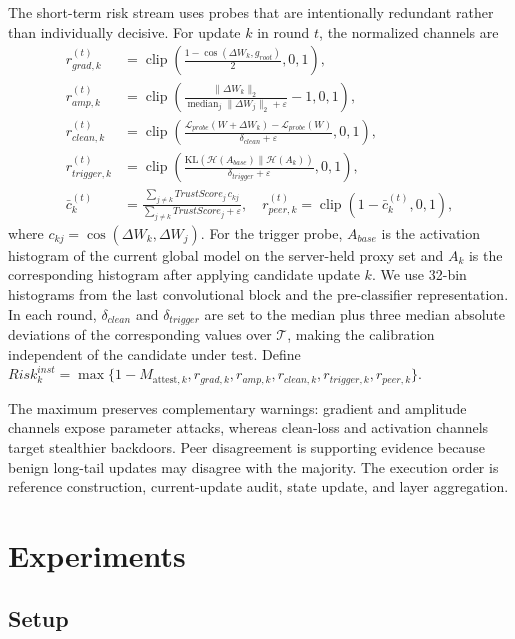 \documentclass[runningheads,orivec]{llncs}
\begin{document}
The short-term risk stream uses probes that are intentionally redundant rather than individually decisive. For update $k$ in round $t$, the normalized channels are
\begin{align}
 r_{grad,k}^{(t)}&=\operatorname{clip}\!\left(\frac{1-\cos(\Delta W_k,g_{root})}{2},0,1\right),\\
 r_{amp,k}^{(t)}&=\operatorname{clip}\!\left(\frac{\|\Delta W_k\|_2}{\operatorname{median}_j\|\Delta W_j\|_2+\varepsilon}-1,0,1\right),\\
 r_{clean,k}^{(t)}&=\operatorname{clip}\!\left(\frac{\mathcal{L}_{probe}(W+\Delta W_k)-\mathcal{L}_{probe}(W)}{\delta_{clean}+\varepsilon},0,1\right),\\
 r_{trigger,k}^{(t)}&=\operatorname{clip}\!\left(\frac{\mathrm{KL}(\mathcal{H}(A_{base})\|\mathcal{H}(A_k))}{\delta_{trigger}+\varepsilon},0,1\right),\\
 \bar c_k^{(t)}&=\frac{\sum_{j\ne k}TrustScore_j\,c_{kj}}{\sum_{j\ne k}TrustScore_j+\varepsilon},\quad
 r_{peer,k}^{(t)}=\operatorname{clip}(1-\bar c_k^{(t)},0,1),
\end{align}
where $c_{kj}=\cos(\Delta W_k,\Delta W_j)$. For the trigger probe, $A_{base}$ is the activation histogram of the current global model on the server-held proxy set and $A_k$ is the corresponding histogram after applying candidate update $k$. We use 32-bin histograms from the last convolutional block and the pre-classifier representation. In each round, $\delta_{clean}$ and $\delta_{trigger}$ are set to the median plus three median absolute deviations of the corresponding values over $\mathcal{T}$, making the calibration independent of the candidate under test. Define $Risk_k^{inst}=\max\{1-M_{\text{attest},k},r_{grad,k},r_{amp,k},r_{clean,k},r_{trigger,k},r_{peer,k}\}$.

The maximum preserves complementary warnings: gradient and amplitude channels expose parameter attacks, whereas clean-loss and activation channels target stealthier backdoors. Peer disagreement is supporting evidence because benign long-tail updates may disagree with the majority. The execution order is reference construction, current-update audit, state update, and layer aggregation.

\section{Experiments}

\subsection{Setup}
\end{document}
